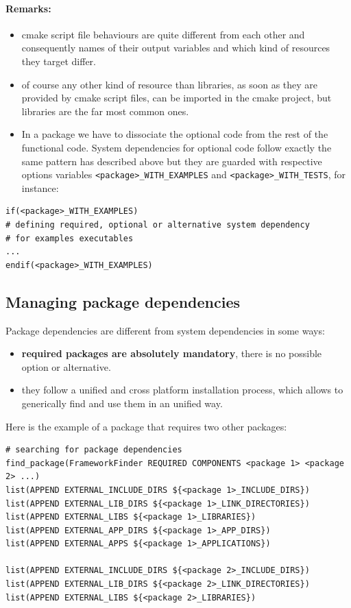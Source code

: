 \documentclass[12pt,a4paper]{article}
\begin{document}
\paragraph{Remarks:}
\begin{itemize}
\item cmake script file behaviours are quite different from each other and consequently names of their output variables and which kind of resources they target differ.
\item of course any other kind of resource than libraries, as soon as they are provided by cmake script files, can be imported in the cmake project, but libraries are the far most common ones.
\item In a package we have to dissociate the optional code from the rest of the functional code. System dependencies for optional code follow exactly the same pattern has described above but they are guarded with respective options variables \texttt{<package>\_WITH\_EXAMPLES} and \texttt{<package>\_WITH\_TESTS}, for instance:
\end{itemize}

\begin{verbatim}
if(<package>_WITH_EXAMPLES)
# defining required, optional or alternative system dependency
# for examples executables
...
endif(<package>_WITH_EXAMPLES)
\end{verbatim}

\subsection{Managing package dependencies}

Package dependencies are different from system dependencies in some ways:
\begin{itemize}
\item \textbf{required packages are absolutely mandatory}, there is no possible option or alternative. 
\item they follow a unified and cross platform installation process, which allows to generically find and use them in an unified way.
\end{itemize} 

Here is the example of a package that requires two other packages:
\begin{verbatim}
# searching for package dependencies
find_package(FrameworkFinder REQUIRED COMPONENTS <package 1> <package 2> ...)
list(APPEND EXTERNAL_INCLUDE_DIRS ${<package 1>_INCLUDE_DIRS})
list(APPEND EXTERNAL_LIB_DIRS ${<package 1>_LINK_DIRECTORIES})
list(APPEND EXTERNAL_LIBS ${<package 1>_LIBRARIES})
list(APPEND EXTERNAL_APP_DIRS ${<package 1>_APP_DIRS})
list(APPEND EXTERNAL_APPS ${<package 1>_APPLICATIONS})

list(APPEND EXTERNAL_INCLUDE_DIRS ${<package 2>_INCLUDE_DIRS})
list(APPEND EXTERNAL_LIB_DIRS ${<package 2>_LINK_DIRECTORIES})
list(APPEND EXTERNAL_LIBS ${<package 2>_LIBRARIES})
\end{verbatim}
\end{document}
